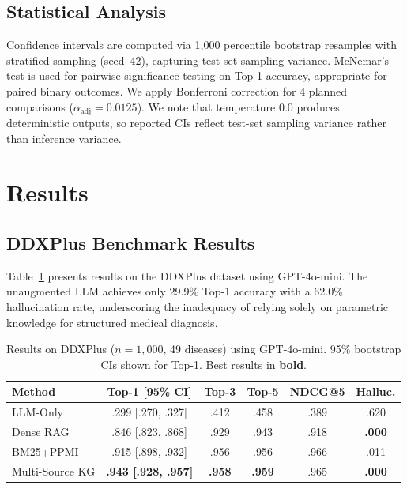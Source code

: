 \documentclass[runningheads]{llncs}
\begin{document}
\subsection{Statistical Analysis}

Confidence intervals are computed via 1,000 percentile bootstrap resamples with stratified sampling (seed~42), capturing test-set sampling variance. McNemar's test is used for pairwise significance testing on Top-1 accuracy, appropriate for paired binary outcomes. We apply Bonferroni correction for 4 planned comparisons ($\alpha_{\text{adj}} = 0.0125$). We note that temperature 0.0 produces deterministic outputs, so reported CIs reflect test-set sampling variance rather than inference variance.

\section{Results}
\label{sec:results}

\subsection{DDXPlus Benchmark Results}

Table~\ref{tab:ddxplus} presents results on the DDXPlus dataset using GPT-4o-mini. The unaugmented LLM achieves only 29.9\% Top-1 accuracy with a 62.0\% hallucination rate, underscoring the inadequacy of relying solely on parametric knowledge for structured medical diagnosis.

\begin{table}[t]
\centering
\caption{Results on DDXPlus ($n{=}1{,}000$, 49 diseases) using GPT-4o-mini. 95\% bootstrap CIs shown for Top-1. Best results in \textbf{bold}.}
\label{tab:ddxplus}
\begin{tabular}{lccccc}
\toprule
\textbf{Method} & \textbf{Top-1 [95\% CI]} & \textbf{Top-3} & \textbf{Top-5} & \textbf{NDCG@5} & \textbf{Halluc.} \\
\midrule
LLM-Only       & .299 [.270, .327] & .412 & .458 & .389 & .620 \\
Dense RAG       & .846 [.823, .868] & .929 & .943 & .918 & \textbf{.000} \\
BM25+PPMI       & .915 [.898, .932] & .956 & .956 & .966 & .011 \\
Multi-Source KG & \textbf{.943 [.928, .957]} & \textbf{.958} & \textbf{.959} & .965 & \textbf{.000} \\
\bottomrule
\end{tabular}
\end{table}
\end{document}
